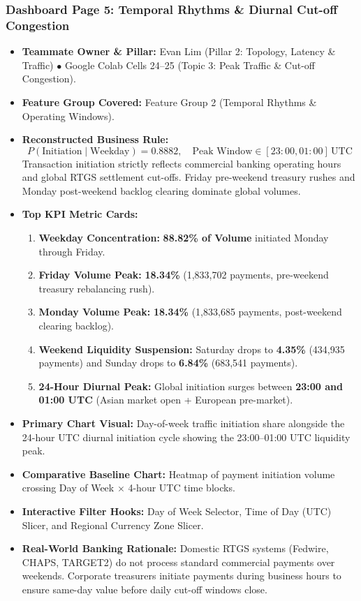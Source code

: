 \documentclass[11pt,a4paper]{article}
\begin{document}
\subsubsection{Dashboard Page 5: Temporal Rhythms \& Diurnal Cut-off Congestion}
\begin{itemize}
    \item \textbf{Teammate Owner \& Pillar:} Evan Lim (Pillar 2: Topology, Latency \& Traffic) $\bullet$ Google Colab Cells 24--25 (Topic 3: Peak Traffic \& Cut-off Congestion).
    \item \textbf{Feature Group Covered:} Feature Group 2 (Temporal Rhythms \& Operating Windows).
    \item \textbf{Reconstructed Business Rule:}
    \begin{equation}
    P(\text{Initiation} \mid \text{Weekday}) = 0.8882, \quad \text{Peak Window} \in [23:00, 01:00]\,\text{UTC}
    \end{equation}
    Transaction initiation strictly reflects commercial banking operating hours and global RTGS settlement cut-offs. Friday pre-weekend treasury rushes and Monday post-weekend backlog clearing dominate global volumes.
    \item \textbf{Top KPI Metric Cards:}
    \begin{enumerate}
        \item \textbf{Weekday Concentration:} \textbf{88.82\% of Volume} initiated Monday through Friday.
        \item \textbf{Friday Volume Peak:} \textbf{18.34\%} (1,833,702 payments, pre-weekend treasury rebalancing rush).
        \item \textbf{Monday Volume Peak:} \textbf{18.34\%} (1,833,685 payments, post-weekend clearing backlog).
        \item \textbf{Weekend Liquidity Suspension:} Saturday drops to \textbf{4.35\%} (434,935 payments) and Sunday drops to \textbf{6.84\%} (683,541 payments).
        \item \textbf{24-Hour Diurnal Peak:} Global initiation surges between \textbf{23:00 and 01:00 UTC} (Asian market open + European pre-market).
    \end{enumerate}
    \item \textbf{Primary Chart Visual:} Day-of-week traffic initiation share alongside the 24-hour UTC diurnal initiation cycle showing the 23:00--01:00 UTC liquidity peak.
    \item \textbf{Comparative Baseline Chart:} Heatmap of payment initiation volume crossing Day of Week $\times$ 4-hour UTC time blocks.
    \item \textbf{Interactive Filter Hooks:} Day of Week Selector, Time of Day (UTC) Slicer, and Regional Currency Zone Slicer.
    \item \textbf{Real-World Banking Rationale:} Domestic RTGS systems (Fedwire, CHAPS, TARGET2) do not process standard commercial payments over weekends. Corporate treasurers initiate payments during business hours to ensure same-day value before daily cut-off windows close.
\end{itemize}
\end{document}
